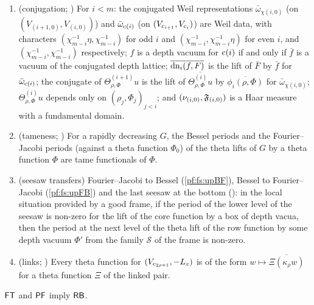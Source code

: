 \begin{enumerate}[label=(T\arabic*)]
\item\label{pf:fs:T1} (conjugation; ) For $i<m$: the conjugated
Weil representations $\bar\omega_{\chi(i,0)}$ (on $(V_{(i+1,0)},V_{(i,0)})$) and $\bar\omega_{\mathrm{c}(i)}$ (on $(V_{\mathrm{c}_{i+1}},V_{\mathrm{c}_i})$) are
Weil data, with characters $(\chi_{m-i}^{-1}\eta,\chi_{m-i}^{-1})$ for odd $i$ and $(\chi_{m-i}^{-1},\chi_{m-i}^{-1}\eta)$ for even $i$, and
$(\chi_{m-i}^{-1},\chi_{m-i}^{-1})$ respectively; $f$ is a depth vacuum for $\mathrm{c}(i)$ if and only if $\bar f$ is a vacuum of the
conjugated depth lattice; $\overline{\mathrm{dn}_i(f,F)}$ is the lift of $\bar F$ by $\bar f$ for $\bar\omega_{\mathrm{c}(i)}$; the conjugate of
$\Theta^{(i+1)}_{\rho,\Phi}u$ is the lift of $\overline{\Theta^{(i)}_{\rho,\Phi}u}$ by $\overline{\phi_i(\rho,\Phi)}$ for
$\bar\omega_{\chi(i,0)}$; $\Theta^{(i)}_{\rho,\Phi}u$ depends only on $(\rho_j,\Phi_j)_{j<i}$; and $(\nu_{(i,0)},\mathfrak F_{(i,0)})$ is a Haar
measure with a fundamental domain.
\item\label{pf:fs:T2} (tameness; ) For a rapidly decreasing $G$,
the Bessel periods and the Fourier--Jacobi periods (against a theta function $\Phi_0$) of the theta lifts of $G$ by a theta function $\Phi$
are tame functionals of $\Phi$.
\item\label{pf:fs:T3} (seesaw transfers) Fourier--Jacobi to Bessel (\cref{pf:fs:upBF}), Bessel to Fourier--Jacobi (\cref{pf:fs:upFB}) and the
last seesaw at the bottom (): in the local situation provided by a good frame, if the period of the
lower level of the seesaw is non-zero for the lift of the core function by a box of depth vacua, then the period at the next level of the
theta lift of the row function by some depth vacuum $\Phi'$ from the family $\mathcal S$ of the frame is non-zero.
\item\label{pf:fs:T4} (links; ) Every theta function for
$(V_{\mathrm{c}_{2\rho+1}},-L_z)$ is of the form $w\mapsto\overline{\Xi(\kappa_\rho w)}$ for a theta function $\Xi$ of the linked pair.
\end{enumerate}

\begin{proposition}\label{pf:fs:rungB}
$\mathsf{FT}$ and $\mathsf{PF}$ imply $\mathsf{RB}$.
\end{proposition}

